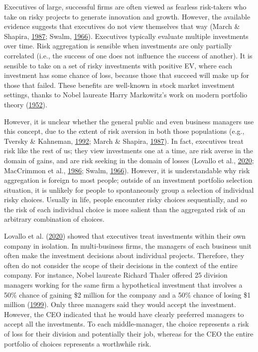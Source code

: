 \documentclass[
  english,
  man, donotrepeattitle,floatsintext]{apa7}
\theoremstyle{definition}
\theoremstyle{definition}
\theoremstyle{definition}
\theoremstyle{definition}
\theoremstyle{remark}
\begin{document}
Executives of large, successful firms are often viewed as fearless risk-takers
who take on risky projects to generate innovation and growth. However, the
available evidence suggests that executives do not view themselves that way
(March \& Shapira, \protect\hyperlink{ref-march1987}{1987}; Swalm, \protect\hyperlink{ref-swalm1966}{1966}). Executives typically evaluate multiple investments
over time. Risk aggregation is sensible when investments are only partially
correlated (i.e., the success of one does not influence the success of another).
It is sensible to take on a set of risky investments with positive EV, where
each investment has some chance of loss, because those that succeed will make up
for those that failed. These benefits are well-known in stock market investment
settings, thanks to Nobel laureate Harry Markowitz's work on modern portfolio
theory (\protect\hyperlink{ref-markowitz1952}{1952}).

However, it is unclear whether the general public and even business managers use
this concept, due to the extent of risk aversion in both those populations
(e.g., Tversky \& Kahneman, \protect\hyperlink{ref-tversky1992}{1992}; March \& Shapira, \protect\hyperlink{ref-march1987}{1987}). In fact, executives treat risk like the rest
of us; they view investments one at a time, are risk averse in the domain of
gains, and are risk seeking in the domain of losses (Lovallo et al., \protect\hyperlink{ref-lovallo2020}{2020}; MacCrimmon et al., \protect\hyperlink{ref-maccrimmon1986}{1986}; Swalm, \protect\hyperlink{ref-swalm1966}{1966}). However, it is understandable why risk aggregation is
foreign to most people; outside of an investment portfolio selection situation,
it is unlikely for people to spontaneously group a selection of individual risky
choices. Usually in life, people encounter risky choices sequentially, and so
the risk of each individual choice is more salient than the aggregated risk of
an arbitrary combination of choices.

Lovallo et al. (\protect\hyperlink{ref-lovallo2020}{2020}) showed that executives treat investments within their own company
in isolation. In multi-business firms, the managers of each business unit often
make the investment decisions about individual projects. Therefore, they often
do not consider the scope of their decisions in the context of the entire
company. For instance, Nobel laureate Richard Thaler offered 25 division
managers working for the same firm a hypothetical investment that involves a 50\%
chance of gaining \$2 million for the company and a 50\% chance of losing \$1
million (\protect\hyperlink{ref-thaler1999}{1999}). Only three managers said they would accept the
investment. However, the CEO indicated that he would have clearly preferred
managers to accept all the investments. To each middle-manager, the choice
represents a risk of loss for their division and potentially their job, whereas
for the CEO the entire portfolio of choices represents a worthwhile risk.
\end{document}
